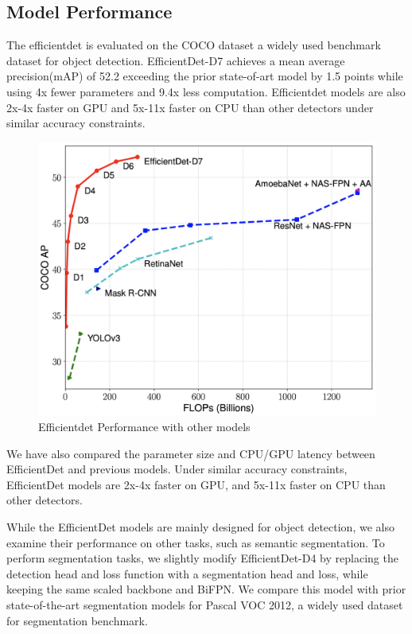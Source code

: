 \documentclass[12pt]{report}
\begin{document}
\subsection{Model Performance}
The efficientdet is evaluated on the COCO\cite{COCO} dataset a widely used benchmark dataset for object detection. EfficientDet-D7 achieves a mean average precision(mAP) of 52.2 exceeding the prior state-of-art model by 1.5 points while using 4x fewer parameters and 9.4x less computation. Efficientdet models are also 2x-4x faster on GPU and 5x-11x faster on CPU than other detectors under similar accuracy constraints.


\begin{figure}[H]\includegraphics[scale=0.3]{det.png}\centering\caption{Efficientdet Performance with other models \cite{Efficientdet}} \label{fig:Efficientdet performance with other models} \end{figure}%

We have also compared the parameter size and CPU/GPU latency between EfficientDet and previous models. Under similar accuracy constraints, EfficientDet models are 2x-4x faster on GPU, and 5x-11x faster on CPU than other detectors.

While the EfficientDet models are mainly designed for object detection, we also examine their performance on other tasks, such as semantic segmentation. To perform segmentation tasks, we slightly modify EfficientDet-D4 by replacing the detection head and loss function with a segmentation head and loss, while keeping the same scaled backbone and BiFPN. We compare this model with prior state-of-the-art segmentation models for Pascal VOC 2012\cite{VOC}, a widely used dataset for segmentation benchmark.
\end{document}
